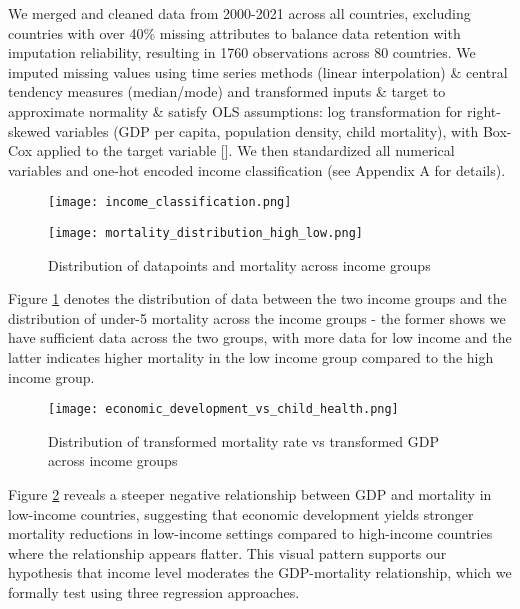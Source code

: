 \documentclass[10pt,a4paper]{article}
\begin{document}
    We merged and cleaned data from 2000-2021 across all countries, excluding countries with over 40\% missing attributes to balance data retention with imputation reliability, resulting in 1760 observations across 80 countries. We imputed missing values using time series methods (linear interpolation) \& central tendency measures (median/mode) and transformed inputs \& target to approximate normality \& satisfy OLS assumptions: log transformation for right-skewed variables (GDP per capita, population density, child mortality), with Box-Cox applied to the target variable [\cite{boxcox_howto}]. We then standardized all numerical variables and one-hot encoded income classification (see Appendix A for details).

    \begin{figure}[H]
    \centering
    \begin{minipage}{0.48\textwidth}
        \centering
        \texttt{[image: income\_classification.png]}
    \end{minipage}
    \hfill
    \begin{minipage}{0.48\textwidth}
        \centering
        \texttt{[image: mortality\_distribution\_high\_low.png]}
    \end{minipage}
    \caption{Distribution of datapoints and mortality across income groups}
    \label{fig:both_plots}
    \end{figure}

    Figure \ref{fig:both_plots} denotes the distribution of data between the two income groups and the distribution of under-5 mortality across the income groups - the former shows we have sufficient data across the two groups, with more data for low income and the latter indicates higher mortality in the low income group compared to the high income group.

    \begin{figure}[H]
    \centering
    \begin{minipage}{0.7\textwidth}
        \centering
        \texttt{[image: economic\_development\_vs\_child\_health.png]}
    \end{minipage}
    \caption{Distribution of transformed mortality rate vs transformed GDP across income groups}
    \label{fig:mortality_gdp_transformed}
    \end{figure}

    Figure \ref{fig:mortality_gdp_transformed} reveals a steeper negative relationship between GDP and mortality in low-income countries, suggesting that economic development yields stronger mortality reductions in low-income settings compared to high-income countries where the relationship appears flatter. This visual pattern supports our hypothesis that income level moderates the GDP-mortality relationship, which we formally test using three regression approaches.
\end{document}
